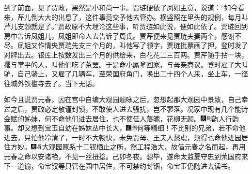 到了前面，见了贾政，果然是小和尚一事。贾琏便依了凤姐主意，说道：“如今看来，芹儿倒大大的出息了，这件事竟交予他去管办。横竖照在里头的规例，每月叫芹儿支领就是了。”贾政原不大理论这些事，听贾琏如此说，便如此依了。贾琏回到房中告诉凤姐儿，凤姐即命人去告诉了周氏。贾芹便来见贾琏夫妻两个，感谢不尽。凤姐又作情央贾琏先支三个月的，叫他写了领字，贾琏批票画了押，登时发了对牌出去。银库上按数发出三个月的供给来，白花花二三百两。贾芹随手拈一块，撂与掌平的人，叫他们吃了茶罢。于是命小厮拿回家，与母亲商议。登时雇了大叫驴，自己骑上，又雇了几辆车，至荣国府角门，唤出二十四个人来，坐上车，一径往城外铁槛寺去了。当下无话。

如今且说贾元春，因在宫中自编大观园题咏之后，忽想起那大观园中景致，自己幸过之后，贾政必定敬谨封锁，不敢使人进去骚扰，岂不寥落。况家中现有几个能诗会赋的姊妹，何不命他们进去居住，也不使佳人落魄，花柳无颜。{\includegraphics[width=3mm]{../Images/00004}\includegraphics[width=3mm]{../Images/00011}\footnotesize \kaishu 韵人行韵事。}却又想到宝玉自幼在姊妹丛中长大，{\includegraphics[width=3mm]{../Images/00006}\includegraphics[width=3mm]{../Images/00011}\footnotesize \kaishu 何等精细！}不比别的兄弟，若不命他进去，只怕他冷清了，一时不大畅快，未免贾母、王夫人愁虑，须得也命他进园居住方妙。{\includegraphics[width=3mm]{../Images/00004}\includegraphics[width=3mm]{../Images/00010}\footnotesize \kaishu 大观园原系十二钗栖止之所，然工程浩大，故借元春之名而起，再用元春之命以安诸艳，不见一丝扭捻。己卯冬夜。}想毕，遂命太监夏守忠到荣国府来下一道谕，命宝钗等只管在园中居住，不可禁约封锢，命宝玉仍随进去读书。

